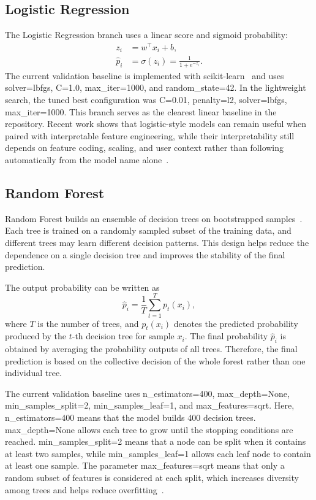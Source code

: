 \documentclass[conference]{IEEEtran}
\renewcommand{\texttt}[1]{\textnormal{#1}}
\begin{document}
\subsection{Logistic Regression}
The Logistic Regression branch uses a linear score and sigmoid probability:
\begin{align}
z_i &= w^\top x_i + b,\\
\hat{p}_i &= \sigma(z_i) = \frac{1}{1 + e^{-z_i}}.
\end{align}
The current validation baseline is implemented with \texttt{scikit-learn}~\cite{scikit_learn} and uses
\texttt{solver=lbfgs}, \texttt{C=1.0}, \texttt{max\_iter=1000}, and \texttt{random\_state=42}. In the lightweight search, the tuned best configuration was \texttt{C=0.01}, \texttt{penalty=l2}, \texttt{solver=lbfgs}, \texttt{max\_iter=1000}. This branch serves as the clearest linear baseline in the repository. Recent work shows that logistic-style models can remain useful when paired with interpretable feature engineering, while their interpretability still depends on feature coding, scaling, and user context rather than following automatically from the model name alone~\cite{rudin2019interpretable,dervovic2024logistic}.

\subsection{Random Forest}

Random Forest builds an ensemble of decision trees on bootstrapped samples~\cite{random_forest}. Each tree is trained on a randomly sampled subset of the training data, and different trees may learn different decision patterns. This design helps reduce the dependence on a single decision tree and improves the stability of the final prediction.

The output probability can be written as
\begin{equation}
\hat{p}_i = \frac{1}{T}\sum_{t=1}^{T} p_t(x_i),
\end{equation}
where $T$ is the number of trees, and $p_t(x_i)$ denotes the predicted probability produced by the $t$-th decision tree for sample $x_i$. The final probability $\hat{p}_i$ is obtained by averaging the probability outputs of all trees. Therefore, the final prediction is based on the collective decision of the whole forest rather than one individual tree.

The current validation baseline uses
\texttt{n\_estimators=400}, \texttt{max\_depth=None}, \texttt{min\_samples\_split=2}, \texttt{min\_samples\_leaf=1}, and \texttt{max\_features=sqrt}. Here, \texttt{n\_estimators=400} means that the model builds 400 decision trees. \texttt{max\_depth=None} allows each tree to grow until the stopping conditions are reached. \texttt{min\_samples\_split=2} means that a node can be split when it contains at least two samples, while \texttt{min\_samples\_leaf=1} allows each leaf node to contain at least one sample. The parameter \texttt{max\_features=sqrt} means that only a random subset of features is considered at each split, which increases diversity among trees and helps reduce overfitting~\cite{random_forest}.
\end{document}
